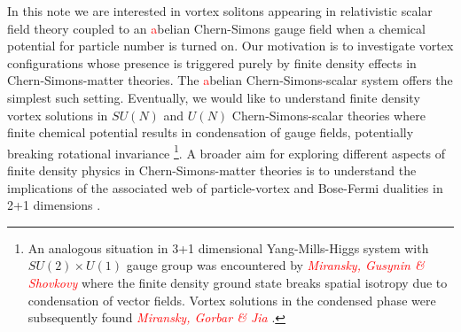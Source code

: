 In this note we are interested in vortex solitons appearing in  relativistic scalar field theory coupled to an \textcolor{red}{a}belian Chern-Simons gauge field when a chemical potential for particle number is turned on. Our motivation is to investigate vortex configurations whose presence is triggered purely by finite density effects in Chern-Simons-matter theories. The \textcolor{red}{a}belian Chern-Simons-scalar system offers the simplest  such setting. Eventually, we would like to understand finite density vortex solutions in $SU(N)$ and $U(N)$ Chern-Simons-scalar theories where  finite chemical potential results in condensation of gauge fields, potentially breaking rotational invariance \cite{Kumar:2018nkf}\footnote{An analogous situation in 3+1 dimensional Yang-Mills-Higgs system with $SU(2)\times U(1)$ gauge group was encountered by \textcolor{red}{\textit{Miransky, Gusynin \& Shovkovy}} \cite{Gusynin:2003yu} where the finite density ground state breaks spatial isotropy due to condensation of vector fields.  Vortex solutions in the condensed phase were subsequently found \textcolor{red}{\textit{Miransky, Gorbar \& Jia}} \cite{Gorbar:2005pi}.}.
A broader aim for exploring different aspects of finite density physics in Chern-Simons-matter theories is to understand the implications of the associated web \cite{Seiberg:2016gmd, Karch:2016sxi, Murugan:2016zal} of particle-vortex and Bose-Fermi dualities in 2+1 dimensions  
\cite{Giombi:2011kc, Aharony:2011jz, Aharony:2012nh, Aharony:2012ns, Jain:2013py, Jain:2013gza, Takimi:2013zca, Aharony:2015mjs, Geracie:2015drf}.

